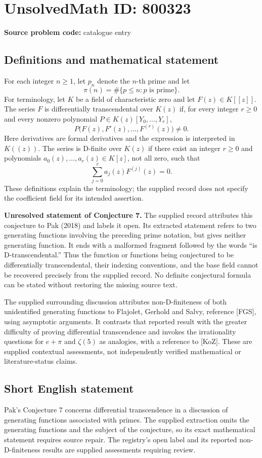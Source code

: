 \documentclass[11pt]{article}
\begin{document}
\section*{UnsolvedMath ID: 800323}
\textbf{Source problem code:} catalogue entry
\subsection{Definitions and mathematical statement}
For each integer \(n\geq 1\), let \(p_n\) denote the \(n\)-th prime and let
\[
\pi(n)=\#\{p\leq n:p\text{ is prime}\}.
\]
For terminology, let \(K\) be a field of characteristic zero and let \(F(z)\in K[[z]]\). The series \(F\) is differentially transcendental over \(K(z)\) if, for every integer \(r\geq 0\) and every nonzero polynomial \(P\in K(z)[Y_0,\ldots,Y_r]\),
\[
P\bigl(F(z),F'(z),\ldots,F^{(r)}(z)\bigr)\neq 0.
\]
Here derivatives are formal derivatives and the expression is interpreted in \(K((z))\). The series is D-finite over \(K(z)\) if there exist an integer \(r\geq 0\) and polynomials \(a_0(z),\ldots,a_r(z)\in K[z]\), not all zero, such that
\[
\sum_{j=0}^{r}a_j(z)F^{(j)}(z)=0.
\]
These definitions explain the terminology; the supplied record does not specify the coefficient field for its intended assertion.

\textbf{Unresolved statement of Conjecture 7.} The supplied record attributes this conjecture to Pak (2018) and labels it open. Its extracted statement refers to two generating functions involving the preceding prime notation, but gives neither generating function. It ends with a malformed fragment followed by the words ``is D-transcendental.'' Thus the function or functions being conjectured to be differentially transcendental, their indexing conventions, and the base field cannot be recovered precisely from the supplied record. No definite conjectural formula can be stated without restoring the missing source text.

The supplied surrounding discussion attributes non-D-finiteness of both unidentified generating functions to Flajolet, Gerhold and Salvy, reference [FGS], using asymptotic arguments. It contrasts that reported result with the greater difficulty of proving differential transcendence and invokes the irrationality questions for \(e+\pi\) and \(\zeta(5)\) as analogies, with a reference to [KoZ]. These are supplied contextual assessments, not independently verified mathematical or literature-status claims.
\subsection{Short English statement}
Pak's Conjecture 7 concerns differential transcendence in a discussion of generating functions associated with primes. The supplied extraction omits the generating functions and the subject of the conjecture, so its exact mathematical statement requires source repair. The registry's open label and its reported non-D-finiteness results are supplied assessments requiring review.
\end{document}
